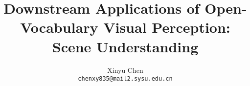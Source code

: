 \documentclass[10pt,twocolumn,letterpaper]{article}
\title{Downstream Applications of Open-Vocabulary Visual Perception: \\Scene Understanding}
\author{Xinyu Chen\\
{\tt\small chenxy835@mail2.sysu.edu.cn}
}
\begin{document}
\maketitle
    



{
    \small
    
    
}
\end{document}
